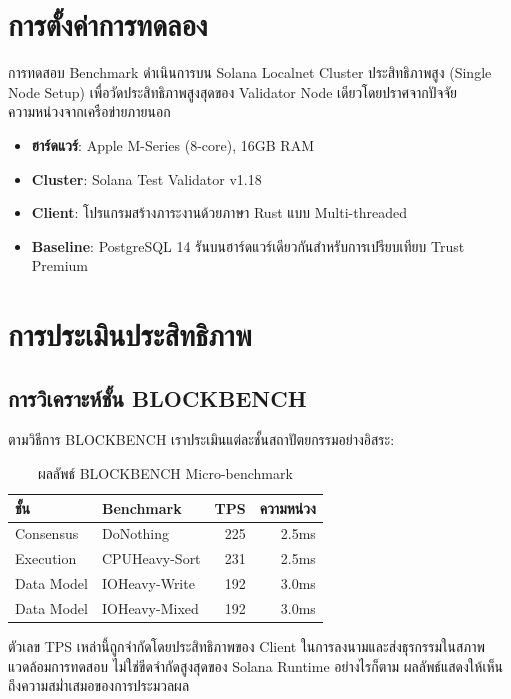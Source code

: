 \documentclass[conference,10pt]{IEEEtran}
\begin{document}
\section{การตั้งค่าการทดลอง}
การทดสอบ Benchmark ดำเนินการบน Solana Localnet Cluster ประสิทธิภาพสูง (Single Node Setup) เพื่อวัดประสิทธิภาพสูงสุดของ Validator Node เดียวโดยปราศจากปัจจัยความหน่วงจากเครือข่ายภายนอก
\begin{itemize}
    \item \textbf{ฮาร์ดแวร์}: Apple M-Series (8-core), 16GB RAM
    \item \textbf{Cluster}: Solana Test Validator v1.18
    \item \textbf{Client}: โปรแกรมสร้างภาระงานด้วยภาษา Rust แบบ Multi-threaded
    \item \textbf{Baseline}: PostgreSQL 14 รันบนฮาร์ดแวร์เดียวกันสำหรับการเปรียบเทียบ Trust Premium
\end{itemize}

\section{การประเมินประสิทธิภาพ}

\subsection{การวิเคราะห์ชั้น BLOCKBENCH}
ตามวิธีการ BLOCKBENCH เราประเมินแต่ละชั้นสถาปัตยกรรมอย่างอิสระ:

\begin{table}[t!]
\caption{ผลลัพธ์ BLOCKBENCH Micro-benchmark}
\begin{center}
\begin{tabular}{|l|l|r|r|}
\hline
\textbf{ชั้น} & \textbf{Benchmark} & \textbf{TPS} & \textbf{ความหน่วง} \\
\hline
Consensus & DoNothing & 225 & 2.5ms \\
Execution & CPUHeavy-Sort & 231 & 2.5ms \\
Data Model & IOHeavy-Write & 192 & 3.0ms \\
Data Model & IOHeavy-Mixed & 192 & 3.0ms \\
\hline
\end{tabular}
\label{tab:blockbench}
\end{center}
\end{table}

ตัวเลข TPS เหล่านี้ถูกจำกัดโดยประสิทธิภาพของ Client ในการลงนามและส่งธุรกรรมในสภาพแวดล้อมการทดสอบ ไม่ใช่ขีดจำกัดสูงสุดของ Solana Runtime อย่างไรก็ตาม ผลลัพธ์แสดงให้เห็นถึงความสม่ำเสมอของการประมวลผล
\end{document}
